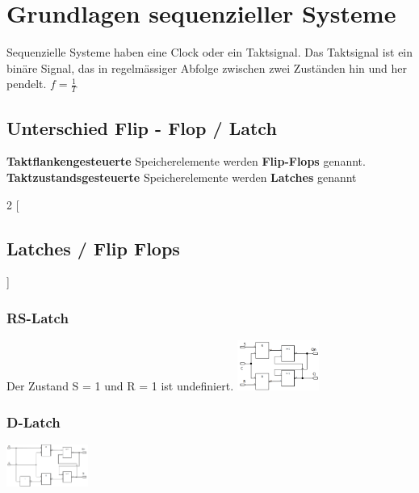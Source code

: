 \documentclass[10pt]{article}
\begin{document}
\section{Grundlagen sequenzieller Systeme}
Sequenzielle Systeme haben eine Clock oder ein Taktsignal. Das Taktsignal ist ein binäre Signal, das in regelmässiger Abfolge zwischen zwei Zuständen hin und her pendelt. $f = \frac{1}{T}$
\subsection{Unterschied Flip - Flop / Latch}
\textbf{Taktflankengesteuerte} Speicherelemente werden \textbf{Flip-Flops} genannt. \\
\textbf{Taktzustandsgesteuerte} Speicherelemente werden \textbf{Latches} genannt
\begin{multicols}{2}
[
\subsection{Latches / Flip Flops}
]
\subsubsection{RS-Latch}
Der Zustand S = 1 und R = 1 ist undefiniert.
\includegraphics[width=0.2\textwidth]{RS-Latch.PNG}
\columnbreak
\subsubsection{D-Latch}
\includegraphics[width=0.2\textwidth]{D-Latch.PNG}
\end{multicols}
\end{document}
